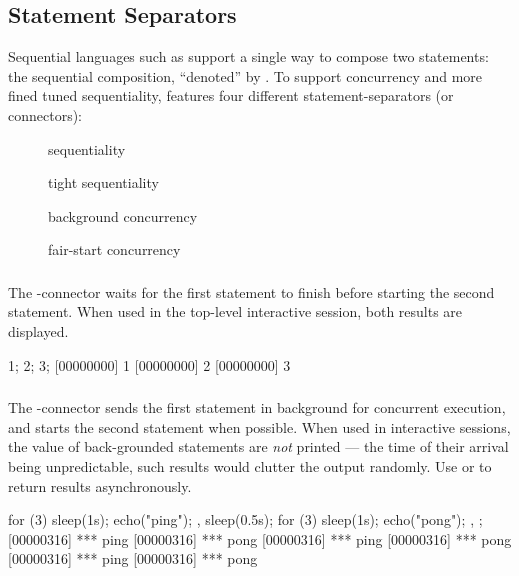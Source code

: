 \subsection{Statement Separators}
\label{sec:lang:separators}

Sequential languages such as \Cxx support a single way to compose two
statements: the sequential composition, ``denoted'' by \samp{;}.  To
support concurrency and more fined tuned sequentiality, \us features
four different statement-separators (or connectors):
\begin{description}
\item[\samp{;}] sequentiality
\item[\samp{|}] tight sequentiality
\item[\samp{,}] background concurrency
\item[\samp{\&}] fair-start concurrency
\end{description}

\subsubsection{\samp{;}}

The \samp{;}-connector waits for the first statement to finish before
starting the second statement.  When used in the top-level interactive
session, both results are displayed.

\begin{urbiscript}
1; 2; 3;
[00000000] 1
[00000000] 2
[00000000] 3
\end{urbiscript}

\subsubsection{\samp{,}}

The \samp{,}-connector sends the first statement in background for
concurrent execution, and starts the second statement when possible.
When used in interactive sessions, the value of back-grounded
statements are \emph{not} printed --- the time of their arrival being
unpredictable, such results would clutter the output randomly.  Use
 or  to return results
asynchronously.

\begin{urbiscript}
{
  for (3)
  {
    sleep(1s);
    echo("ping");
  },
  sleep(0.5s);
  for (3)
  {
    sleep(1s);
    echo("pong");
  },
};
[00000316] *** ping
[00000316] *** pong
[00000316] *** ping
[00000316] *** pong
[00000316] *** ping
[00000316] *** pong
\end{urbiscript}


